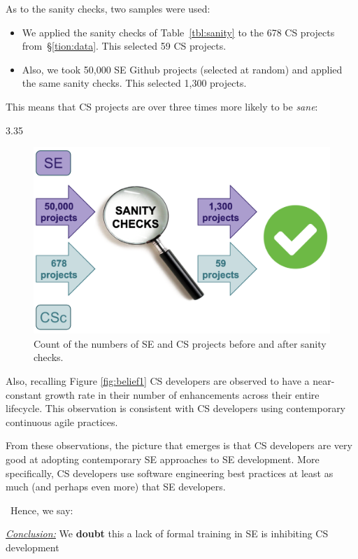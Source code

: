 \documentclass[sigconf]{acmart}
\newcommand{\bi}{\begin{itemize}}
\newcommand{\ei}{\end{itemize}}
\newenvironment{RQ}{\vspace{1mm}\begin{tcolorbox}[enhanced,width=3.4in,size=fbox,colback=red!5!white,drop shadow southeast,sharp corners]}{\end{tcolorbox}}
\begin{document}
As to the sanity checks, 
two samples were used:
\bi
\item
We applied the sanity checks
of Table~\ref{tbl:sanity} to the 678 CS projects from~\S\ref{tion:data}. This selected 59 CS projects.
\item
Also, we took 50,000 SE Github projects (selected at random) and applied
the same sanity checks. This selected 1,300 projects.
\ei
This means that CS projects are over three times more likely to be {\em sane}: 

\centerline{  3.35 }

\begin{figure}
  \centering
  \includegraphics[width=\linewidth]{img/sanity.png} 
  \caption{Count of the numbers of SE and CS projects  before and after sanity checks.}
  \label{fig:sanity}
\end{figure}
 Also, recalling Figure \ref{fig:belief1} CS developers are observed to have a near-constant growth rate in their number of enhancements across their entire lifecycle. This observation is consistent with CS developers using
  contemporary continuous agile practices. 

From these observations, the picture that emerges is that CS developers are very good at adopting contemporary  SE approaches to SE development. More specifically, CS developers
use software engineering best practices   at least as much (and perhaps even more) that SE developers. 

\
Hence, we say: 
\begin{RQ}
\textit{\underline{Conclusion:}} We \textbf{doubt} this a lack of formal training in SE is inhibiting CS development
\end{RQ}
\end{document}
